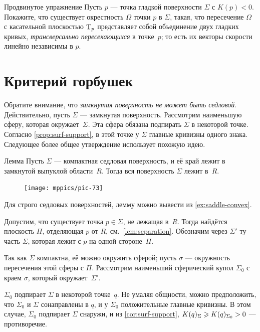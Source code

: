 \begin{thm}{Продвинутое упражнение}\label{ex:crosss}
Пусть $p$ --- точка гладкой поверхности $\Sigma$ с $K(p)<0$.
Покажите, что существует окрестность $\Omega$ точки $p$ в $\Sigma$,
такая, что пересечение $\Omega$ с касательной плоскостью $\mathrm{T}_p$ представляет собой объединение двух гладких кривых, \emph{трансверсально пересекающихся} в точке~$p$;
то есть их векторы скорости линейно независимы в $p$.
\end{thm}



\section{Критерий горбушек}

Обратите внимание, что \textit{замкнутая поверхность не может быть седловой}.
Действительно, пусть $\Sigma$ --- замкнутая поверхность.
Рассмотрим наименьшую сферу, которая окружает~$\Sigma$.
Эта сфера обязана подпирать $\Sigma$ в некоторой точке.
Согласно \ref{prop:surf-support}, в этой точке у $\Sigma$ главные кривизны одного знака.
Следующее более общее утверждение использует похожую идею.

\begin{thm}{Лемма}\label{lem:convex-saddle}
Пусть $\Sigma$ --- компактная седловая поверхность, и её край лежит в замкнутой выпуклой области~$R$.
Тогда вся поверхность $\Sigma$ лежит в~$R$.
\end{thm}

{

\begin{figure}
\vskip-8mm
\centering
\texttt{[image: mppics/pic-73]}
\vskip-4mm
\end{figure}

Для строго седловых поверхностей, лемму можно вывести из \ref{ex:saddle-convex}.

Допустим, что существует точка $p\in \Sigma$,  не лежащая в~$R$.
Тогда найдётся плоскость $\Pi$, отделяющая $p$ от $R$, см.~\ref{lem:separation}.
Обозначим через $\Sigma'$ ту часть $\Sigma$, которая лежит с $p$ на одной стороне~$\Pi$.

}

Так как $\Sigma$ компактна, её можно окружить сферой;
пусть $\sigma$ --- окружность пересечения этой сферы с $\Pi$.
Рассмотрим наименьший сферический купол $\Sigma_0$ с краем $\sigma$, который окружает~$\Sigma'$.

$\Sigma_0$ подпирает $\Sigma$ в некоторой точке~$q$.
Не умаляя общности, можно предположить, что $\Sigma_0$ и $\Sigma$ сонаправлены в $q$, и у $\Sigma_0$ положительные главные кривизны.
В этом случае, $\Sigma_0$ подпирает $\Sigma$ снаружи,
и из \ref{cor:surf-support}, $K(q)_\Sigma\z\ge K(q)_{\Sigma_0}>0$ --- противоречие.
\qeds


